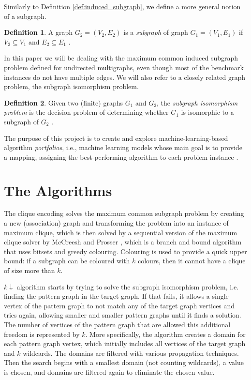 \documentclass{l4proj}
\theoremstyle{definition}
\newtheorem{definition}{Definition}[section]
\theoremstyle{remark}
\begin{document}
Similarly to Definition \ref{def:induced_subgraph}, we define a more general
notion of a subgraph.

\begin{definition} A graph $G_2 = (V_2, E_2)$ is a \emph{subgraph} of graph $G_1
  = (V_1, E_1)$ if $V_2 \subseteq V_1$ and $E_2 \subseteq E_1$
  \cite{DBLP:books/daglib/0030488}.
\end{definition}

In this paper we will be dealing with the maximum common induced subgraph
problem defined for undirected multigraphs, even though most of the benchmark
instances do not have multiple edges. We will also refer to a closely related
graph problem, the subgraph isomorphism problem.

\begin{definition}
  Given two (finite) graphs $G_1$ and $G_2$, the \emph{subgraph isomorphism
    problem} is the decision problem of determining whether $G_1$ is isomorphic
  to a subgraph of $G_2$ \cite{DBLP:conf/stoc/Cook71}.
\end{definition}

The purpose of this project is to create and explore machine-learning-based
algorithm \emph{portfolios}, i.e., machine learning models whose main goal is to
provide a mapping, assigning the best-performing algorithm to each problem
instance \cite{DBLP:journals/ai/BischlKKLMFHHLT16, DBLP:journals/ac/Rice76}.

\chapter{The Algorithms}
The clique encoding \cite{DBLP:conf/cp/McCreeshNPS16} solves the maximum common
subgraph problem by creating a new (association) graph and transforming the
problem into an instance of maximum clique, which is then solved by a sequential
version of the maximum clique solver by McCreesh and Prosser
\cite{DBLP:journals/topc/McCreeshP15}, which is a branch and bound algorithm
that uses bitsets and greedy colouring. Colouring is used to provide a quick
upper bound: if a subgraph can be coloured with $k$ colours, then it cannot have
a clique of size more than $k$.

$k\downarrow$ algorithm \cite{DBLP:conf/aaai/HoffmannMR17} starts by trying to
solve the subgraph isomorphism problem, i.e. finding the pattern graph in the
target graph. If that fails, it allows a single vertex of the pattern graph to
not match any of the target graph vertices and tries again, allowing smaller and
smaller pattern graphs until it finds a solution. The number of vertices of the
pattern graph that are allowed this additional freedom is represented by $k$.
More specifically, the algorithm creates a domain for each pattern graph vertex,
which initially includes all vertices of the target graph and $k$ wildcards. The
domains are filtered with various propagation techniques. Then the search begins
with a smallest domain (not counting wildcards), a value is chosen, and domains
are filtered again to eliminate the chosen value.
\end{document}
